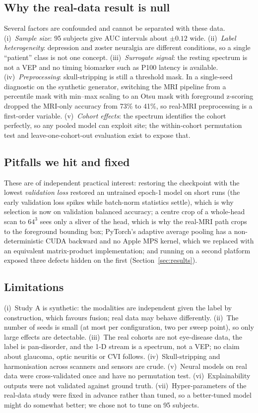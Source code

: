 \subsection{Why the real-data result is null}
Several factors are confounded and cannot be separated with these data. (i)~\emph{Sample size}: 95 subjects give AUC intervals about $\pm0.12$ wide. (ii)~\emph{Label heterogeneity}: depression and zoster neuralgia are different conditions, so a single ``patient'' class is not one concept. (iii)~\emph{Surrogate signal}: the resting spectrum is not a VEP and no timing biomarker such as P100 latency is available. (iv)~\emph{Preprocessing}: skull-stripping is still a threshold mask. In a single-seed diagnostic on the synthetic generator, switching the MRI pipeline from a percentile mask with min--max scaling to an Otsu mask with foreground z-scoring dropped the MRI-only accuracy from 73\% to 41\%, so real-MRI preprocessing is a first-order variable. (v)~\emph{Cohort effects}: the spectrum identifies the cohort perfectly, so any pooled model can exploit site; the within-cohort permutation test and leave-one-cohort-out evaluation exist to expose that.

\subsection{Pitfalls we hit and fixed}
These are of independent practical interest: restoring the checkpoint with the lowest \emph{validation loss} restored an untrained epoch-1 model on short runs (the early validation loss spikes while batch-norm statistics settle), which is why selection is now on validation balanced accuracy; a centre crop of a whole-head scan to $64^3$ sees only a sliver of the head, which is why the real-MRI path crops to the foreground bounding box; PyTorch's adaptive average pooling has a non-deterministic CUDA backward and no Apple MPS kernel, which we replaced with an equivalent matrix-product implementation; and running on a second platform exposed three defects hidden on the first (Section~\ref{sec:results}).

\subsection{Limitations}
(i)~Study A is synthetic: the modalities are independent given the label by construction, which favours fusion; real data may behave differently. (ii)~The number of seeds is small (at most \nSeedsMax{} per configuration, two per sweep point), so only large effects are detectable. (iii)~The real cohorts are not eye-disease data, the label is pan-disorder, and the 1-D stream is a spectrum, not a VEP; no claim about glaucoma, optic neuritis or CVI follows. (iv)~Skull-stripping and harmonisation across scanners and sensors are crude. (v)~Neural models on real data were cross-validated once and have no permutation test. (vi)~Explainability outputs were not validated against ground truth. (vii)~Hyper-parameters of the real-data study were fixed in advance rather than tuned, so a better-tuned model might do somewhat better; we chose not to tune on 95 subjects.

